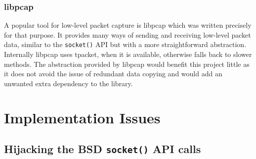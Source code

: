 \documentclass[11pt,a4paper,british]{bhamarticle}
\begin{document}
\begin{multicols}{2}
\subsubsection{libpcap}
A popular tool for low-level packet capture is libpcap which was written precisely for that purpose. It provides many ways of sending and receiving low-level packet data, similar to the \texttt{socket()} API but with a more straightforward abstraction. Internally libpcap uses tpacket, when it is available, otherwise falls back to slower methods. The abstraction provided by libpcap would benefit this project little as it does not avoid the issue of redundant data copying and would add an unwanted extra dependency to the library.





\section{Implementation Issues}
\subsection{Hijacking the BSD \texttt{socket()} API calls} %


\end{multicols}
\end{document}
